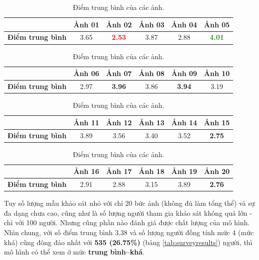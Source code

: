 \documentclass[a4paper, 12pt]{report}
\begin{document}
\begin{table}[!h]
\centering
\begin{tabular}{c|c|c|c|c|c|}
\cline{2-6}
                                               & \textbf{Ảnh 01} & \textbf{Ảnh 02} & \textbf{Ảnh 03} & \textbf{Ảnh 04} & \textbf{Ảnh 05} \\ \hline
\multicolumn{1}{|c|}{\textbf{Điểm trung bình}} & 3.65            & \textcolor{red}{\textbf{2.53}}            & 3.87            & 2.88            & \textcolor{ForestGreen}{\textbf{4.01}}            \\ \hline
\end{tabular}

\begin{tabular}{c|c|c|c|c|c|}
\cline{2-6}
                                               & \textbf{Ảnh 06} & \textbf{Ảnh 07} & \textbf{Ảnh 08} & \textbf{Ảnh 09} & \textbf{Ảnh 10} \\ \hline
\multicolumn{1}{|c|}{\textbf{Điểm trung bình}} & 2.97            & \textcolor{JungleGreen}{\textbf{3.96}}            & 3.86            & \textcolor{JungleGreen}{\textbf{3.94}}            & 3.19            \\ \hline
\end{tabular}

\begin{tabular}{c|c|c|c|c|c|}
\cline{2-6}
                                               & \textbf{Ảnh 11} & \textbf{Ảnh 12} & \textbf{Ảnh 13} & \textbf{Ảnh 14} & \textbf{Ảnh 15} \\ \hline
\multicolumn{1}{|c|}{\textbf{Điểm trung bình}} & 3.89            & 3.56             & 3.40            & 3.52            & \textcolor{Mahogany}{\textbf{2.75}}            \\ \hline
\end{tabular}

\begin{tabular}{c|c|c|c|c|c|}
\cline{2-6}
                                               & \textbf{Ảnh 16} & \textbf{Ảnh 17} & \textbf{Ảnh 18} & \textbf{Ảnh 19} & \textbf{Ảnh 20} \\ \hline
\multicolumn{1}{|c|}{\textbf{Điểm trung bình}} & 2.91            & 2.88            & 3.15            & 3.89            & \textcolor{Mahogany}{\textbf{2.76}}            \\ \hline
\end{tabular}
\caption{Điểm trung bình của các ảnh.}
\label{tab:statsurvey}
\end{table}

Tuy số lượng mẫu khảo sát nhỏ với chỉ 20 bức ảnh (không đủ làm tổng thể) và sự đa dạng chưa cao, cũng như là số lượng người tham gia khảo sát không quá lớn - chỉ với 100 người.
Nhưng cũng phần nào đánh giá được chất lượng của mô hình.
Nhìn chung, với số điểm trung bình 3.38 và số lượng người đồng tính mức 4 (mức khá) cũng đông đảo nhất với \textbf{535 (26.75\%)} (bảng \ref{tab:surveyresults}) người, thì mô hình có thể xem ở mức \textbf{trung bình--khá}.
\end{document}
